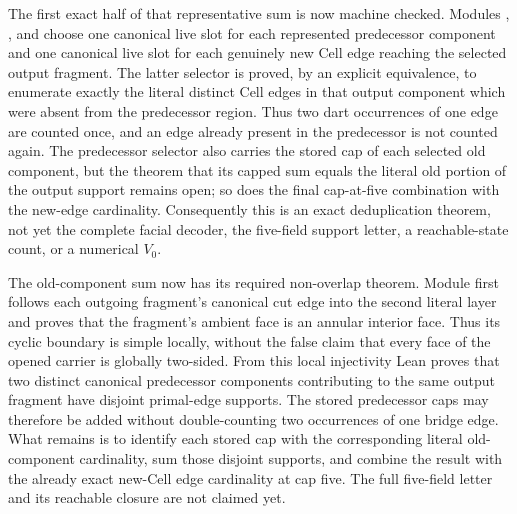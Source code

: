 \documentclass[11pt]{article}
\theoremstyle{definition}
\begin{document}
The first exact half of that representative sum is now machine checked.
Modules
,
,
and
choose one canonical live slot for each represented predecessor component and
one canonical live slot for each genuinely new Cell edge reaching the selected
output fragment.  The latter selector is proved, by an explicit equivalence,
to enumerate exactly the literal distinct Cell edges in that output component
which were absent from the predecessor region.  Thus two dart occurrences of
one edge are counted once, and an edge already present in the predecessor is
not counted again.  The predecessor selector also carries the stored cap of
each selected old component, but the theorem that its capped sum equals the
literal old portion of the output support remains open; so does the final
cap-at-five combination with the new-edge cardinality.  Consequently this is
an exact deduplication theorem, not yet the complete facial decoder, the
five-field support letter, a reachable-state count, or a numerical $V_0$.

The old-component sum now has its required non-overlap theorem.  Module
first follows each outgoing fragment's canonical cut edge into the second
literal layer and proves that the fragment's ambient face is an annular
interior face.  Thus its cyclic boundary is simple locally, without the false
claim that every face of the opened carrier is globally two-sided.  From this
local injectivity Lean proves that two distinct canonical predecessor
components contributing to the same output fragment have disjoint primal-edge
supports.  The stored predecessor caps may therefore be added without
double-counting two occurrences of one bridge edge.  What remains is to
identify each stored cap with the corresponding literal old-component
cardinality, sum those disjoint supports, and combine the result with the
already exact new-Cell edge cardinality at cap five.  The full five-field
letter and its reachable closure are not claimed yet.
\end{document}
